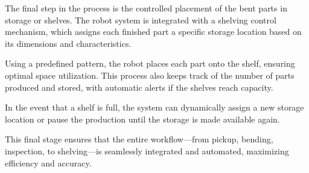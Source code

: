 The final step in the process is the controlled placement of the bent parts in storage or shelves. The robot system is integrated with a shelving control mechanism, which assigns each finished part a specific storage location based on its dimensions and characteristics.

Using a predefined pattern, the robot places each part onto the shelf, ensuring optimal space utilization. This process also keeps track of the number of parts produced and stored, with automatic alerts if the shelves reach capacity.

In the event that a shelf is full, the system can dynamically assign a new storage location or pause the production until the storage is made available again.

This final stage ensures that the entire workflow—from pickup, bending, inspection, to shelving—is seamlessly integrated and automated, maximizing efficiency and accuracy.

